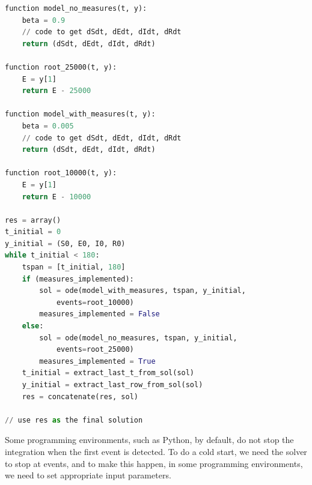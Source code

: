 \begin{minipage}{\linewidth}
\centering
\begin{lstlisting}[language=Python]
function model_no_measures(t, y):
    beta = 0.9
    // code to get dSdt, dEdt, dIdt, dRdt
    return (dSdt, dEdt, dIdt, dRdt)

function root_25000(t, y):
    E = y[1]
    return E - 25000

function model_with_measures(t, y):
    beta = 0.005
    // code to get dSdt, dEdt, dIdt, dRdt
    return (dSdt, dEdt, dIdt, dRdt)

function root_10000(t, y):
    E = y[1]
    return E - 10000

res = array()
t_initial = 0
y_initial = (S0, E0, I0, R0)
while t_initial < 180:
    tspan = [t_initial, 180]
    if (measures_implemented):
        sol = ode(model_with_measures, tspan, y_initial,
            events=root_10000)
        measures_implemented = False
    else:
        sol = ode(model_no_measures, tspan, y_initial,
            events=root_25000)
        measures_implemented = True
    t_initial = extract_last_t_from_sol(sol)
    y_initial = extract_last_row_from_sol(sol)
    res = concatenate(res, sol)

// use res as the final solution
\end{lstlisting}
\end{minipage}

Some programming environments, such as Python, by default, do not stop the integration when the first event is detected. To do a cold start, we need the solver to stop at events, and to make this happen, in some programming environments, we need to set appropriate input parameters. 

